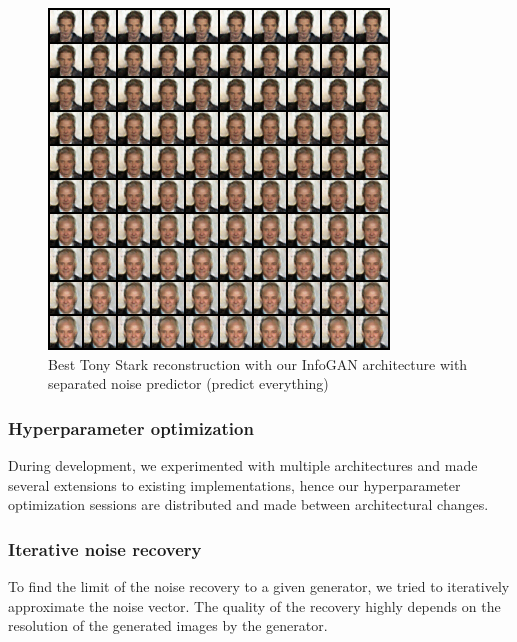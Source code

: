 \documentclass{egpubl}
\begin{document}
\begin{figure}[!htb]
	\centering
	\includegraphics[width=1\linewidth]{pic/predict_everything}
	\caption{Best Tony Stark reconstruction with our InfoGAN architecture with separated noise predictor (predict everything)}
	\label{fig:best3}
\end{figure}

\subsubsection{Hyperparameter optimization}

During development, %
we experimented with multiple architectures and made several extensions to existing implementations, hence our hyperparameter optimization sessions are distributed and made between architectural changes. 


\subsubsection{Iterative noise recovery}

To find the limit of the noise recovery to a given generator, %
we tried to iteratively approximate the noise vector. The quality of the recovery highly depends on the resolution of the generated images by the generator.\\
\end{document}
